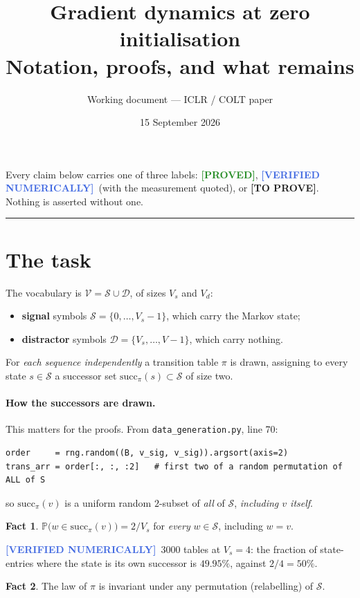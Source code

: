 \documentclass[11pt,a4paper]{article}
\title{\bf Gradient dynamics at zero initialisation\\[4pt]
\large Notation, proofs, and what remains}
\author{Working document --- ICLR / COLT paper}
\date{15 September 2026}
\theoremstyle{plain}
\theoremstyle{definition}
\newtheorem{fact}{Fact}
\newcommand{\PROVED}{\textcolor{ForestGreen}{\textbf{[PROVED]}}}
\newcommand{\TODO}{\textcolor{BrickRed}{\textbf{[TO PROVE]}}}
\newcommand{\NUM}{\textcolor{RoyalBlue}{\textbf{[VERIFIED NUMERICALLY]}}}
\newcommand{\Sig}{\mathcal{S}}
\newcommand{\Dis}{\mathcal{D}}
\newcommand{\1}{\mathbf{1}}
\newcommand{\PP}{\mathbb{P}}
\begin{document}
\maketitle

\noindent
Every claim below carries one of three labels: \PROVED, \NUM\ (with the measurement quoted), or
\TODO. Nothing is asserted without one.

\tableofcontents
\bigskip\hrule

\section{The task}

The vocabulary is $\mathcal{V}=\Sig\cup\Dis$, of sizes $V_s$ and $V_d$:
\begin{itemize}[nosep]
\item \textbf{signal} symbols $\Sig=\{0,\dots,V_s-1\}$, which carry the Markov state;
\item \textbf{distractor} symbols $\Dis=\{V_s,\dots,V-1\}$, which carry nothing.
\end{itemize}

For \emph{each sequence independently} a transition table $\pi$ is drawn, assigning to every state
$s\in\Sig$ a successor set $\mathrm{succ}_\pi(s)\subset\Sig$ of size two.

\paragraph{How the successors are drawn.}
This matters for the proofs. From \texttt{data\_generation.py}, line 70:
\begin{verbatim}
order     = rng.random((B, v_sig, v_sig)).argsort(axis=2)
trans_arr = order[:, :, :2]   # first two of a random permutation of ALL of S
\end{verbatim}
so $\mathrm{succ}_\pi(v)$ is a uniform random $2$-subset of \emph{all} of $\Sig$, \emph{including
$v$ itself}.

\begin{fact}\label{fact:unif}
$\PP\bigl(w\in\mathrm{succ}_\pi(v)\bigr)=2/V_s$ for \emph{every} $w\in\Sig$, including $w=v$.
\end{fact}
\noindent\NUM\ $3000$ tables at $V_s=4$: the fraction of state-entries where the state is its own
successor is $49.95\%$, against $2/4=50\%$.

\begin{fact}\label{fact:sym}
The law of $\pi$ is invariant under any permutation (relabelling) of $\Sig$.
\end{fact}
\end{document}
